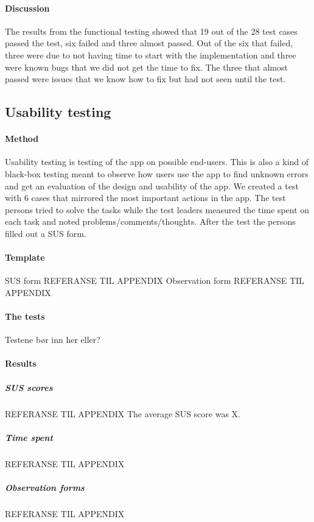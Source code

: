 			\paragraph{Discussion}
			The results from the functional testing showed that 19 out of the 28 test cases passed the test,  six failed and three almost passed. Out of the six that failed, three were due to not having time to start with the implementation and three were known bugs that we did not get the time to fix. The three that almost passed were issues that we know how to fix but had not seen until the test.
	\subsection{Usability testing}
		\paragraph{Method}
			Usability testing is testing of the app on possible end-users. This is also a kind of black-box testing meant to observe how users use the app to find unknown errors and get an evaluation of the design and usability of the app. We created a test with 6 cases that mirrored the most important actions in the app. The test persons tried to solve the tasks while the test leaders measured the time spent on each task and noted problems/comments/thoughts. After the test the persons filled out a SUS form.
		\paragraph{Template}
			SUS form REFERANSE TIL APPENDIX
			\newline\newline
			Observation form REFERANSE TIL APPENDIX
		\paragraph{The tests}
			Testene bør inn her eller?
		\paragraph{Results}
			\subparagraph{SUS scores}
			REFERANSE TIL APPENDIX 
			The average SUS score was X. 
			\newline\newline
			\subparagraph{Time spent}
			REFERANSE TIL APPENDIX
			\subparagraph{Observation forms}
			REFERANSE TIL APPENDIX
